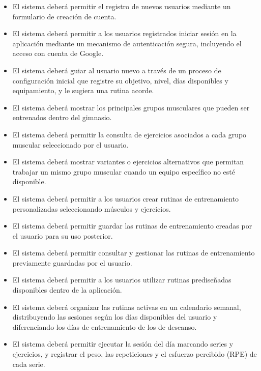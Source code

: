 \begin{itemize}
    \item El sistema deberá permitir el registro de nuevos usuarios mediante un formulario de creación de cuenta.
    
    \item El sistema deberá permitir a los usuarios registrados iniciar sesión en la aplicación mediante un mecanismo de autenticación segura, incluyendo el acceso con cuenta de Google.

    \item El sistema deberá guiar al usuario nuevo a través de un proceso de configuración inicial que registre su objetivo, nivel, días disponibles y equipamiento, y le sugiera una rutina acorde.

    \item El sistema deberá mostrar los principales grupos musculares que pueden ser entrenados dentro del gimnasio.
    
    \item El sistema deberá permitir la consulta de ejercicios asociados a cada grupo muscular seleccionado por el usuario.
    
    \item El sistema deberá mostrar variantes o ejercicios alternativos que permitan trabajar un mismo grupo muscular cuando un equipo específico no esté disponible.
    
    \item El sistema deberá permitir a los usuarios crear rutinas de entrenamiento personalizadas seleccionando músculos y ejercicios.
    
    \item El sistema deberá permitir guardar las rutinas de entrenamiento creadas por el usuario para su uso posterior.
    
    \item El sistema deberá permitir consultar y gestionar las rutinas de entrenamiento previamente guardadas por el usuario.
    
    \item El sistema deberá permitir a los usuarios utilizar rutinas prediseñadas disponibles dentro de la aplicación.
    
    \item El sistema deberá organizar las rutinas activas en un calendario semanal, distribuyendo las sesiones según los días disponibles del usuario y diferenciando los días de entrenamiento de los de descanso.

    \item El sistema deberá permitir ejecutar la sesión del día marcando series y ejercicios, y registrar el peso, las repeticiones y el esfuerzo percibido (RPE) de cada serie.


\end{itemize}
